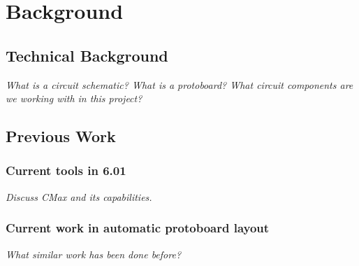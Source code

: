 
\chapter{Background}

\section{Technical Background}

\textit{What is a circuit schematic? What is a protoboard? What circuit
components are we working with in this project?}

\section{Previous Work}

\subsection{Current tools in 6.01}

\textit{Discuss CMax and its capabilities.}

\subsection{Current work in automatic protoboard layout}

\textit{What similar work has been done before?}
